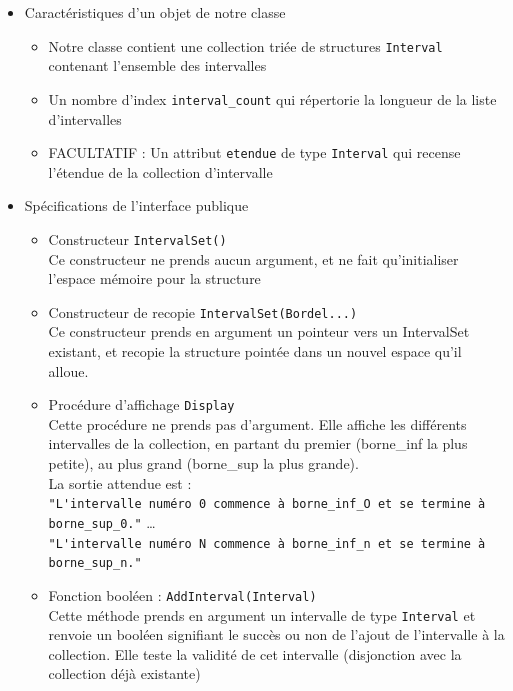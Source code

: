 \documentclass[a4paper,french,10pt,twoside]{article}
\begin{document}
\begin{itemize}
	\item{\large Caractéristiques d'un objet de notre classe }
	\begin{itemize}
		\item{Notre classe contient une collection triée de structures \verb!Interval! contenant l'ensemble des intervalles}
		\item{Un nombre d'index \verb!interval_count! qui répertorie la longueur de la liste d'intervalles}
		\item{FACULTATIF : Un attribut \verb!etendue! de type \verb!Interval! qui recense l'étendue de la collection d'intervalle}
	\end{itemize}
	\item{\large Spécifications de l'interface publique}
	\begin{itemize}
		\item{Constructeur \verb!IntervalSet()!}\\
			Ce constructeur ne prends aucun argument, et ne fait qu'initialiser l'espace mémoire pour la structure\\
		\item{Constructeur de recopie \verb!IntervalSet(Bordel...)!  }\\
			Ce constructeur prends en argument un pointeur vers un IntervalSet existant, et recopie 
			la structure pointée dans un nouvel espace qu'il alloue.\\
		\item{Procédure d'affichage \verb!Display!}\\
			Cette procédure ne prends pas d'argument. Elle affiche les différents intervalles de la collection, en partant du premier
			(borne\_inf la plus petite), au plus grand (borne\_sup la plus grande).\\
			La sortie attendue est :\\ 
				\verb!"L'intervalle numéro 0 commence à borne_inf_O et se termine à borne_sup_0."!
				\dots \\
				\verb!"L'intervalle numéro N commence à borne_inf_n et se termine à borne_sup_n."!\\
		\item{Fonction booléen : \verb!AddInterval(Interval)!}\\
			Cette méthode prends en argument un intervalle de type \verb!Interval! et renvoie un booléen
			signifiant le succès ou non de l'ajout de l'intervalle à la collection.
			Elle teste la validité de cet intervalle (disjonction avec la collection déjà existante)

\end{itemize}
\end{itemize}
\end{document}

